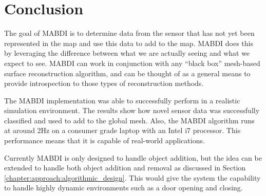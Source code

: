 \chapter{Conclusion} \label{chapter:conclusion}

The goal of MABDI is to determine data from the sensor that has not yet been
represented in the map and use this data to add to the map. MABDI does this by
leveraging the difference between what we are actually seeing and what we expect
to see. MABDI can work in conjunction with any ``black box'' mesh-based surface
reconstruction algorithm, and can be thought of as a general means to provide
introspection to those types of reconstruction methods.

 The MABDI implementation was able to successfully perform in a realistic
 simulation environment. The results show how novel sensor data was
 successfully classified and used to add to the global mesh. Also, the MABDI
 algorithm runs at around 2Hz on a consumer grade laptop with an Intel i7
 processor. This performance means that it is capable of real-world
 applications.

 Currently MABDI is only designed to handle object addition, but the idea can be
 extended to handle both object addition and removal as discussed in Section
 \ref{chapter:approach:algorithmic_design}. This would give the system the
 capability to handle highly dynamic environments such as a door opening and
 closing.
